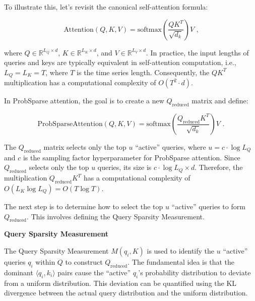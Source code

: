 To illustrate this, let’s revisit the canonical self-attention formula:

\begin{equation}
\text{Attention}(Q, K, V) = \text{softmax}\left(\frac{QK^T}{\sqrt{d_k}}\right)V \text{ ,}
\end{equation}

where \( Q \in \mathbb{R}^{L_Q \times d} \), \( K \in \mathbb{R}^{L_K \times d} \), and \( V \in \mathbb{R}^{L_V \times d} \). In practice, the input lengths of queries and keys are typically equivalent in self-attention computation, i.e., \( L_Q = L_K = T \), where \( T \) is the time series length. Consequently, the \( QK^T \) multiplication has a computational complexity of \( O(T^2 \cdot d) \).

In ProbSparse attention, the goal is to create a new \( Q_{\text{reduced}} \) matrix and define:

\begin{equation}
\text{ProbSparseAttention}(Q, K, V) = \text{softmax}\left(\frac{Q_{\text{reduced}} K^T}{\sqrt{d_k}}\right)V \text{ .}
\end{equation}

The \( Q_{\text{reduced}} \) matrix selects only the top \( u \) ``active'' queries, where \( u = c \cdot \log L_Q \) and \( c \) is the sampling factor hyperparameter for ProbSparse attention. Since \( Q_{\text{reduced}} \) selects only the top \( u \) queries, its size is \( c \cdot \log L_Q \times d \). Therefore, the multiplication \( Q_{\text{reduced}} K^T \) has a computational complexity of \( O(L_K \log L_Q) = O(T \log T) \).

The next step is to determine how to select the top \( u \) ``active'' queries to form \( Q_{\text{reduced}} \). This involves defining the Query Sparsity Measurement.
\vspace{10pt}

\noindent\textbf{Query Sparsity Measurement}

\vspace{10pt}
\noindent The Query Sparsity Measurement \( M(q_i, K) \) is used to identify the \( u \) ``active'' queries \( q_i \) within \( Q \) to construct \( Q_{\text{reduced}} \). The fundamental idea is that the dominant \( \langle q_i, k_i \rangle \) pairs cause the ``active'' \( q_i \)'s probability distribution to deviate from a uniform distribution. This deviation can be quantified using the KL divergence between the actual query distribution and the uniform distribution.

